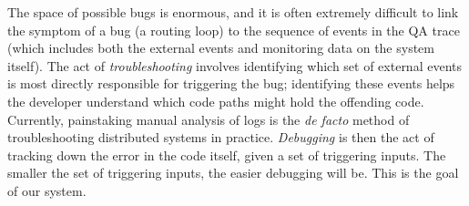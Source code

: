 The space of possible bugs is enormous, and it is often extremely difficult to link the symptom of a bug (\eg a routing loop) to the sequence of events in the QA trace (which includes both the external events and monitoring data on the system itself). The act of {\em troubleshooting} involves identifying which set of external events is most directly responsible for triggering the bug; identifying these events helps the developer understand which code paths might hold the offending code. Currently, painstaking manual analysis of logs is the {\em de facto} method of troubleshooting distributed systems in practice.
{\em Debugging} is then the act of tracking down the error in the code itself, given a set of triggering inputs. The smaller the set of triggering inputs, the easier debugging will be. This is the goal of our system.

